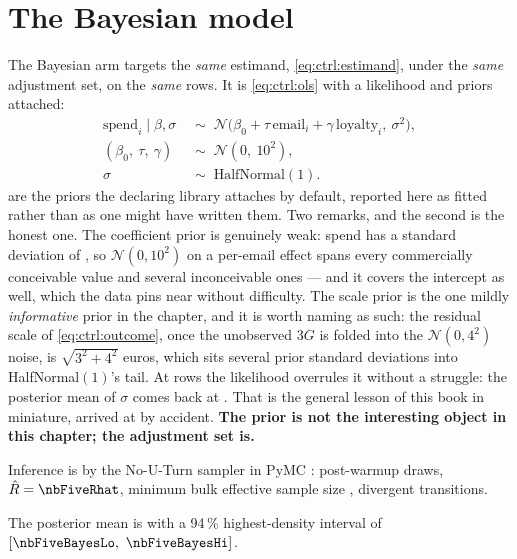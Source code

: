 \section{The Bayesian model}
\label{sec:ctrl:bayes}

The Bayesian arm targets the \emph{same} estimand, \cref{eq:ctrl:estimand}, under the \emph{same}
adjustment set, on the \emph{same} \nbFiveN{} rows. It is \cref{eq:ctrl:ols} with a likelihood
and priors attached:
%
\begin{align}
  \text{spend}_i \mid \beta, \sigma
    &\;\sim\; \mathcal N\big(\beta_0 + \tau\,\text{email}_i + \gamma\,\text{loyalty}_i,\ \sigma^2\big),
    \label{eq:ctrl:lik}\\
  (\beta_0,\ \tau,\ \gamma) &\;\sim\; \mathcal N(0,\ 10^2), \label{eq:ctrl:prior_b}\\
  \sigma &\;\sim\; \text{HalfNormal}(1). \label{eq:ctrl:prior_s}
\end{align}
%
 are the priors the declaring library attaches by default,
reported here as fitted rather than as one might have written them. Two remarks, and the second is
the honest one. The coefficient prior is genuinely weak: spend has a standard deviation of
\eur{\nbFiveSpendSd}, so $\mathcal N(0, 10^2)$ on a per-email effect spans every commercially
conceivable value and several inconceivable ones --- and it covers the intercept as well, which the
data pins near  without difficulty. The scale prior is the one mildly \emph{informative}
prior in the chapter, and it is worth naming as such: the residual scale of \cref{eq:ctrl:outcome},
once the unobserved $3G$ is folded into the $\mathcal N(0, 4^2)$ noise, is
$\sqrt{3^2 + 4^2}$ euros, which sits several prior standard deviations into HalfNormal$(1)$'s
tail. At \nbFiveN{}
rows the likelihood overrules it without a struggle: the posterior mean of $\sigma$ comes back at
\eur{\nbFiveSigmaPost}. That is the general lesson of this book in miniature, arrived at by
accident. \textbf{The prior is not the interesting object in this chapter; the adjustment set is.}

Inference is by the No-U-Turn sampler \citep{hoffman2014} in PyMC
\citep{salvatier2016}: \nbFiveNDraws{} post-warmup draws, $\hat R = \nbFiveRhat$, minimum bulk
effective sample size \nbFiveEss{} \citep{vehtari2021}, \nbFiveDivergences{} divergent
transitions.

The posterior mean is \eur{\nbFiveBayesEst} with a 94\,\% highest-density interval of
$[\nbFiveBayesLo,\ \nbFiveBayesHi]$.


